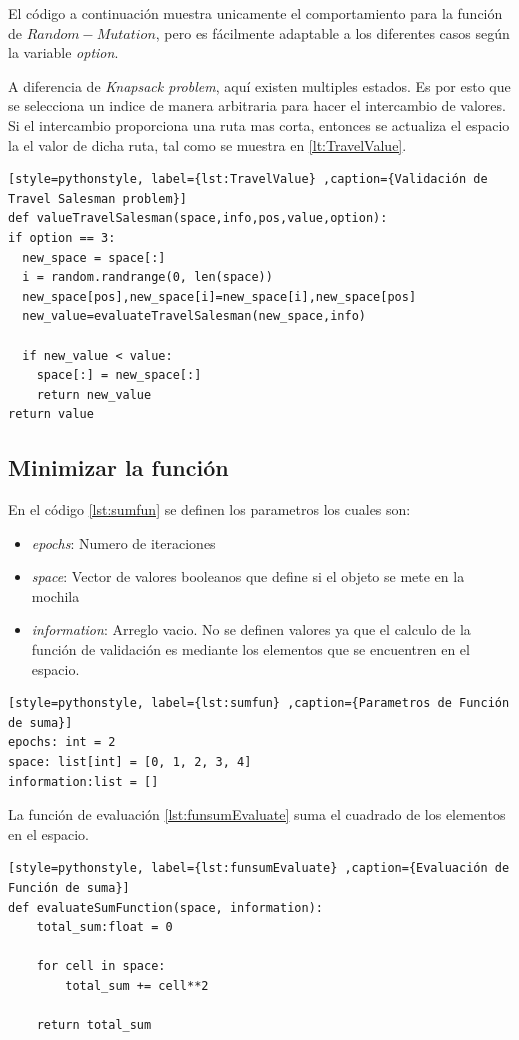 \documentclass[12pt,twoside]{article}
\begin{document}
El código a continuación muestra unicamente el comportamiento para la función de $Random-Mutation$, pero es fácilmente adaptable a los diferentes casos según la variable \textit{option}.

A diferencia de \textit{Knapsack problem}, aquí existen multiples estados. Es por esto que se selecciona un indice de manera arbitraria para hacer el intercambio de valores. Si el intercambio proporciona una ruta mas corta, entonces se actualiza el espacio la el valor de dicha ruta, tal como se muestra en \ref{lt:TravelValue}.  

\begin{lstlisting}[style=pythonstyle, label={lst:TravelValue} ,caption={Validación de Travel Salesman problem}]
def valueTravelSalesman(space,info,pos,value,option):
if option == 3:
  new_space = space[:]
  i = random.randrange(0, len(space))
  new_space[pos],new_space[i]=new_space[i],new_space[pos]
  new_value=evaluateTravelSalesman(new_space,info)

  if new_value < value: 
    space[:] = new_space[:]
    return new_value
return value
\end{lstlisting}

\clearpage
\subsection{Minimizar la función}

En el código \ref{lst:sumfun} se definen los parametros los cuales son:
\begin{itemize}
	\item \textit{epochs}: Numero de iteraciones
	\item \textit{space}: Vector de valores booleanos que define si el objeto se mete en la mochila
	\item \textit{information}: Arreglo vacio. No se definen valores ya que el calculo de la función de validación es mediante los elementos que se encuentren en el espacio.
\end{itemize}

\begin{lstlisting}[style=pythonstyle, label={lst:sumfun} ,caption={Parametros de Función de suma}]
epochs: int = 2
space: list[int] = [0, 1, 2, 3, 4]
information:list = []
\end{lstlisting}

La función de evaluación \ref{lst:funsumEvaluate} suma el cuadrado de los elementos en el  espacio. 

\begin{lstlisting}[style=pythonstyle, label={lst:funsumEvaluate} ,caption={Evaluación de Función de suma}]
def evaluateSumFunction(space, information):
	total_sum:float = 0
	
	for cell in space:
		total_sum += cell**2
	
	return total_sum\end{lstlisting}
\end{document}
